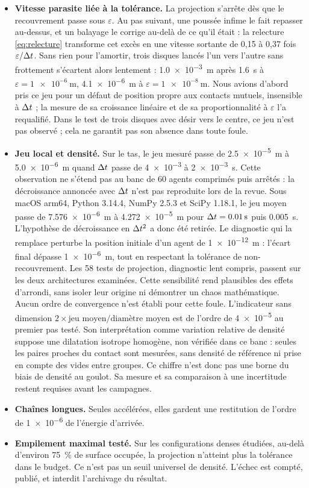 \begin{itemize}
\item \textbf{Vitesse parasite liée à la tolérance.} La projection s'arrête dès
  que le recouvrement passe sous $\varepsilon$. Au pas suivant, une poussée
  infime le fait repasser au-dessus, et un balayage le corrige au-delà de ce
  qu'il était : la relecture \eqref{eq:relecture} transforme cet excès en une
  vitesse sortante de 0,15 à 0,37 fois $\varepsilon/\Delta t$. Sans rien pour
  l'amortir, trois disques lancés l'un vers l'autre sans frottement
  s'écartent alors lentement : \SI{1.0e-3}{\metre} après \SI{1.6}{\second} à
  $\varepsilon=\SI{1e-6}{\metre}$, \SI{4.1e-6}{\metre} à
  $\varepsilon=\SI{1e-8}{\metre}$. Nous avions d'abord pris ce jeu pour un
  défaut de position propre aux contacts mutuels, insensible à $\Delta t$ ; la mesure
  de sa croissance linéaire et de sa proportionnalité à $\varepsilon$ l'a
  requalifié. Dans le test de trois disques avec désir vers le centre, ce jeu
  n'est pas observé ; cela ne garantit pas son absence dans toute foule.
\item \textbf{Jeu local et densité.} Sur le tas, le jeu mesuré passe de
  \SI{2.5e-5}{\metre} à \SI{5.0e-6}{\metre} quand $\Delta t$ passe de
  \num{4e-3} à \SI{2e-3}{\second}. Cette observation ne s'étend pas au banc
  de 60 agents comprimés puis arrêtés : la décroissance annoncée avec $\Delta t$
  n'est pas reproduite lors de la revue. Sous macOS arm64, Python 3.14.4,
  NumPy 2.5.3 et SciPy 1.18.1, le jeu moyen passe de \SI{7.576e-6}{\metre}
  à \SI{4.272e-5}{\metre} pour $\Delta t=\SI{0.01}{\second}$ puis
  \SI{0.005}{\second}. L'hypothèse de décroissance en $\Delta t^2$ a donc été retirée.
  Le diagnostic qui la remplace perturbe la position initiale d'un agent de
  \SI{1e-12}{\metre} : l'écart final dépasse \SI{1e-6}{\metre}, tout en
  respectant la tolérance de non-recouvrement. Les 58 tests de projection,
  diagnostic lent compris, passent sur les deux architectures examinées.
  Cette sensibilité rend plausibles des effets d'arrondi, sans isoler leur
  origine ni démontrer un chaos mathématique. Aucun ordre de convergence
  n'est établi pour cette foule.
  L'indicateur sans dimension
  $2\times\text{jeu moyen}/\text{diamètre moyen}$ est de l'ordre de
  \num{4e-5} au premier pas testé.
  Son interprétation comme variation relative de densité suppose une dilatation
  isotrope homogène, non vérifiée dans ce banc : seules les paires proches du
  contact sont mesurées, sans densité de référence ni prise en compte des vides
  entre groupes. Ce chiffre n'est donc pas une borne du biais de densité au goulot.
  Sa mesure et sa comparaison à une incertitude restent requises avant les campagnes.
\item \textbf{Chaînes longues.} Seules accélérées, elles gardent une restitution
  de l'ordre de \num{1e-6} de l'énergie d'arrivée.
\item \textbf{Empilement maximal testé.} Sur les configurations denses étudiées,
  au-delà d'environ \SI{75}{\percent} de surface occupée, la projection n'atteint
  plus la tolérance dans le budget. Ce n'est pas un seuil universel de densité. L'échec est
  compté, publié, et interdit l'archivage du résultat.
\end{itemize}

